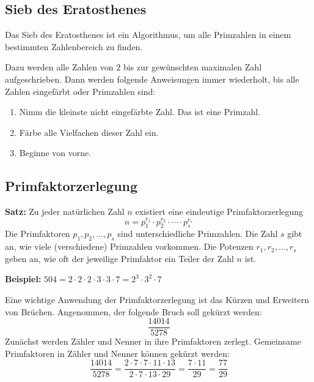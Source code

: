 \subsection{Sieb des Eratosthenes}

Das Sieb des Eratosthenes ist ein Algorithmus, um alle Primzahlen in einem bestimmten Zahlenbereich zu finden.

Dazu werden alle Zahlen von $2$ bis zur gewünschten maximalen Zahl aufgeschrieben. Dann werden folgende Anweisungen immer wiederholt, bis alle Zahlen eingefärbt oder Primzahlen sind:
\begin{enumerate}
  \item Nimm die kleinste nicht eingefärbte Zahl. Das ist eine Primzahl.
  \item Färbe alle Vielfachen dieser Zahl ein.
  \item Beginne von vorne.
\end{enumerate}

\newpage
\subsection{Primfaktorzerlegung}

\begin{theorem}
  \textbf{Satz:} Zu jeder natürlichen Zahl $n$ existiert eine eindeutige Primfaktorzerlegung
  \[
    n = p_{1}^{r_{1}} \cdot p_{2}^{r_{2}} \cdot \cdots \cdot p_{s}^{r_{s}}
  \]
  Die Primfaktoren $p_{1}, p_{2}, \ldots, p_{s}$ sind unterschiedliche Primzahlen. Die Zahl $s$ gibt an, wie viele (verschiedene) Primzahlen vorkommen. Die Potenzen $r_{1}, r_{2},\ldots, r_{s}$ geben an, wie oft der jeweilige Primfaktor ein Teiler der Zahl $n$ ist.
\end{theorem}
\begin{example}
  \textbf{Beispiel:} $504 = 2\cdot 2\cdot 2\cdot 3\cdot 3\cdot 7 = 2^{3}\cdot 3^{2}\cdot 7$
\end{example}
Eine wichtige Anwendung der Primfaktorzerlegung ist das Kürzen und Erweitern von Brüchen. Angenommen, der folgende Bruch soll gekürzt werden:
\[
  \frac{14014}{5278}
\]
Zunächst werden Zähler und Nenner in ihre Primfaktoren zerlegt. Gemeinsame Primfaktoren in Zähler und Nenner können gekürzt werden:
\[
  \frac{14014}{5278} = \frac{2\cdot 7\cdot 7\cdot 11\cdot 13}{2\cdot 7\cdot 13\cdot 29} = \frac{7\cdot 11}{29} = \frac{77}{29}
\]

